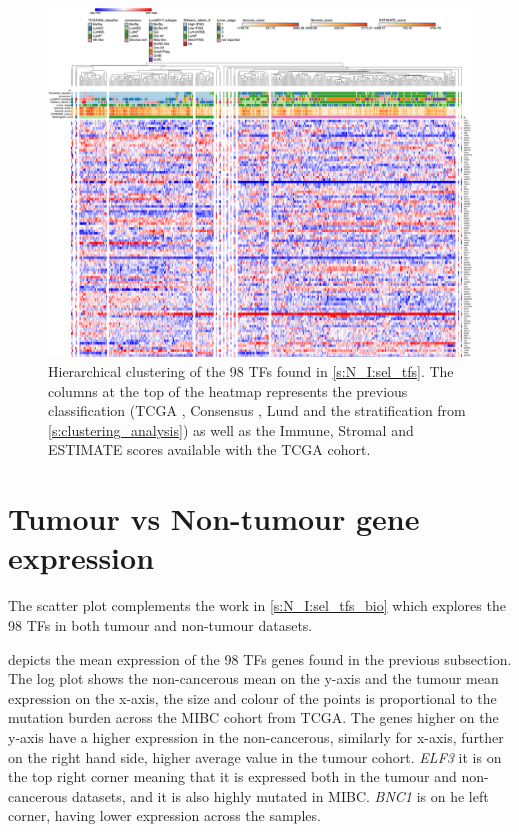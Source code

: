 \begin{figure}
    \centering
    \includegraphics[width=1.0\textwidth,keepaspectratio]{Sections/Network_I/Resources/selective_pruning/15_CS_norm_sel_tfs.png}
      \caption{Hierarchical clustering of the 98 TFs found in \cref{s:N_I:sel_tfs}. The columns at the top of the heatmap represents the previous classification (TCGA \cite{Robertson2017-mg}, Consensus \cite{Kamoun2020-tj}, Lund \cite{Marzouka2018-ge} and the stratification from \cref{s:clustering_analysis}) as well as the Immune, Stromal and ESTIMATE scores available with the TCGA cohort.}
    \label{fig:ap:morph_sel_tfs}
\end{figure}

\section{Tumour vs Non-tumour gene expression} \label{s:ap:tum_vs_non-tumour}


The scatter plot complements the work in \cref{s:N_I:sel_tfs_bio} which explores the 98 TFs in both tumour and non-tumour datasets.

 depicts the mean expression of the 98 TFs genes found in the previous subsection. The log plot shows the non-cancerous mean on the y-axis and the tumour mean expression on the x-axis, the size and colour of the points is proportional to the mutation burden across the MIBC cohort from TCGA. The genes higher on the y-axis have a higher expression in the non-cancerous, similarly for x-axis, further on the right hand side, higher average value in the tumour cohort. \textit{ELF3} it is on the top right corner meaning that it is expressed both in the tumour and non-cancerous datasets, and it is also highly mutated in MIBC. \textit{BNC1} is on he left corner, having lower expression across the samples.

